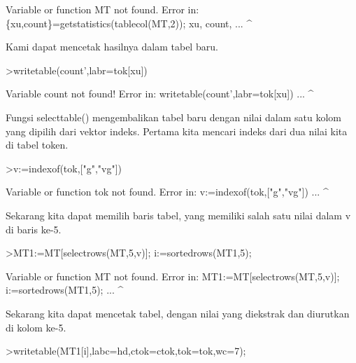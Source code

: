 \documentclass[a4paper,10pt]{article}
\begin{document}
\begin{eulernotebook}
\begin{eulercomment}
\begin{eulercomment}
\begin{eulercomment}
\begin{eulercomment}
\begin{eulercomment}
\begin{eulercomment}
\begin{eulercomment}
\begin{eulercomment}
\begin{eulercomment}
\begin{eulercomment}
\begin{eulercomment}
\begin{eulercomment}
\begin{eulercomment}
\begin{eulercomment}
\begin{eulercomment}
\begin{eulercomment}
\begin{eulercomment}
\begin{eulercomment}
\begin{eulerprompt}
\end{eulerprompt}
\begin{euleroutput}
  Variable or function MT not found.
  Error in:
  \{xu,count\}=getstatistics(tablecol(MT,2)); xu, count, ...
                                      ^
\end{euleroutput}
\begin{eulercomment}
Kami dapat mencetak hasilnya dalam tabel baru.
\end{eulercomment}
\begin{eulerprompt}
>writetable(count',labr=tok[xu])
\end{eulerprompt}
\begin{euleroutput}
  Variable count not found!
  Error in:
  writetable(count',labr=tok[xu]) ...
                   ^
\end{euleroutput}
\begin{eulercomment}
Fungsi selecttable() mengembalikan tabel baru dengan nilai dalam satu
kolom yang dipilih dari vektor indeks. Pertama kita mencari indeks
dari dua nilai kita di tabel token.
\end{eulercomment}
\begin{eulerprompt}
>v:=indexof(tok,["g","vg"])
\end{eulerprompt}
\begin{euleroutput}
  Variable or function tok not found.
  Error in:
  v:=indexof(tok,["g","vg"]) ...
                ^
\end{euleroutput}
\begin{eulercomment}
Sekarang kita dapat memilih baris tabel, yang memiliki salah satu
nilai dalam v di baris ke-5.
\end{eulercomment}
\begin{eulerprompt}
>MT1:=MT[selectrows(MT,5,v)]; i:=sortedrows(MT1,5);
\end{eulerprompt}
\begin{euleroutput}
  Variable or function MT not found.
  Error in:
  MT1:=MT[selectrows(MT,5,v)]; i:=sortedrows(MT1,5); ...
                       ^
\end{euleroutput}
\begin{eulercomment}
Sekarang kita dapat mencetak tabel, dengan nilai yang diekstrak dan
diurutkan di kolom ke-5.
\end{eulercomment}
\begin{eulerprompt}
>writetable(MT1[i],labc=hd,ctok=ctok,tok=tok,wc=7);
\end{eulerprompt}
\begin{euleroutput}

\end{euleroutput}
\end{eulercomment}
\end{eulercomment}
\end{eulercomment}
\end{eulercomment}
\end{eulercomment}
\end{eulercomment}
\end{eulercomment}
\end{eulercomment}
\end{eulercomment}
\end{eulercomment}
\end{eulercomment}
\end{eulercomment}
\end{eulercomment}
\end{eulercomment}
\end{eulercomment}
\end{eulercomment}
\end{eulercomment}
\end{eulercomment}
\end{eulernotebook}
\end{document}
